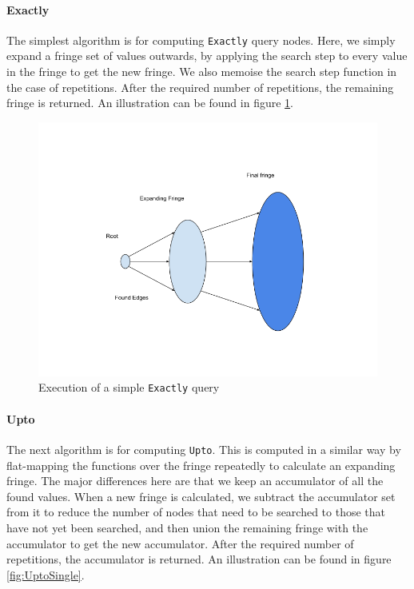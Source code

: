 \documentclass[12pt,a4paper,twoside,openright]{report}
\newcommand\codeName[1]{\texttt{#1}}
\begin{document}
		\paragraph{Exactly}
The simplest algorithm is for computing \codeName{Exactly} query nodes. Here, we simply expand a fringe set of values outwards, by applying the search step to every value in the fringe to get the new fringe. We also memoise the search step function in the case of repetitions. After the required number of repetitions, the remaining fringe is returned. An illustration can be found in figure \ref{fig:ExactlySingle}.

\begin{figure}[ht]
\centering
  \includegraphics[width=\textwidth]{figs/Exactly.png}
  \caption{Execution of a simple \codeName{Exactly} query}
  \label{fig:ExactlySingle}
\end{figure}
    		\paragraph{Upto}
The next algorithm is for computing \codeName{Upto}. This is computed in a similar way by flat-mapping the functions over the fringe repeatedly to calculate an expanding fringe. The major differences here are that we keep an accumulator of all the found values. When a new fringe is calculated, we subtract the accumulator set from it to reduce the number of nodes that need to be searched to those that have not yet been searched, and then union the remaining fringe with the accumulator to get the new accumulator. After the required number of repetitions, the accumulator is returned. An illustration can be found in figure \ref{fig:UptoSingle}.
\end{document}
